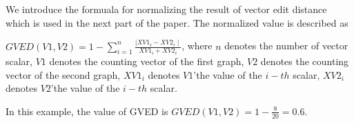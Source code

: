 \begin{table}[htbp]
	\centering
	\caption{Feature Indexing}
	\label{tab:featureIndex}%
\end{table}%


We introduce the formuala for normalizing the result of vector edit distance which is used in the next part of the paper. The normalized value is described as

$GVED(V1, V2) = 1 - \sum_{i=1}^{n} \frac{ \mid XV1_i - XV2_i \mid}{XV1_i + XV2_i}$, 
where $n$ denotes the number of vector scalar, $V1$ denotes the counting vector of the first graph, $V2$ denotes the counting vector of the second graph, $XV1_i$ denotes $V1$\rq the value of the $i-th$ scalar, $XV2_i$ denotes $V2$\rq the value of the $i-th$ scalar.  

In this example, the value of GVED is $GVED(V1, V2) = 1 - \frac{8 }{20} = 0.6$.

